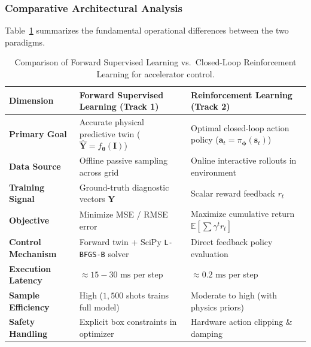 \documentclass[11pt,a4paper]{article}
\begin{document}
\subsubsection{Comparative Architectural Analysis}
Table~\ref{tab:sl_vs_rl} summarizes the fundamental operational differences between the two paradigms.

\begin{table}[h!]
\centering
\small
\begin{tabular}{p{3.5cm} p{5.5cm} p{5.5cm}}
\toprule
\textbf{Dimension} & \textbf{Forward Supervised Learning (Track 1)} & \textbf{Reinforcement Learning (Track 2)} \\
\midrule
\textbf{Primary Goal} & Accurate physical predictive twin ($\hat{\mathbf{Y}} = f_{\boldsymbol{\theta}}(\mathbf{I})$) & Optimal closed-loop action policy ($\mathbf{a}_t = \pi_{\boldsymbol{\phi}}(\mathbf{s}_t)$) \\
\textbf{Data Source} & Offline passive sampling across grid & Online interactive rollouts in environment \\
\textbf{Training Signal} & Ground-truth diagnostic vectors $\mathbf{Y}$ & Scalar reward feedback $r_t$ \\
\textbf{Objective} & Minimize MSE / RMSE error & Maximize cumulative return $\mathbb{E}[\sum \gamma^t r_t]$ \\
\textbf{Control Mechanism} & Forward twin + SciPy \texttt{L-BFGS-B} solver & Direct feedback policy evaluation \\
\textbf{Execution Latency} & $\approx 15 - 30\text{ ms}$ per step & $\approx 0.2\text{ ms}$ per step \\
\textbf{Sample Efficiency} & High ($1,500$ shots trains full model) & Moderate to high (with physics priors) \\
\textbf{Safety Handling} & Explicit box constraints in optimizer & Hardware action clipping \& damping \\
\bottomrule
\end{tabular}
\caption{Comparison of Forward Supervised Learning vs.\ Closed-Loop Reinforcement Learning for accelerator control.}
\label{tab:sl_vs_rl}
\end{table}
\end{document}
